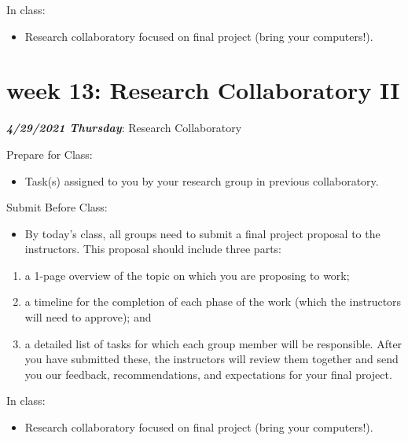\documentclass[
]{book}
\providecommand{\tightlist}{%
  \setlength{\itemsep}{0pt}\setlength{\parskip}{0pt}}
\begin{document}
In class:

\begin{itemize}
\tightlist
\item
  Research collaboratory focused on final project (bring your computers!).
\end{itemize}

\hypertarget{week-13-research-collaboratory-ii-1}{%
\chapter{week 13: Research Collaboratory II}\label{week-13-research-collaboratory-ii-1}}

\textbf{\emph{4/29/2021 Thursday}}: Research Collaboratory

Prepare for Class:

\begin{itemize}
\tightlist
\item
  Task(s) assigned to you by your research group in previous collaboratory.
\end{itemize}

Submit Before Class:

\begin{itemize}
\tightlist
\item
  By today's class, all groups need to submit a final project proposal to the instructors. This proposal should include three parts:
\end{itemize}

\begin{enumerate}
\def\labelenumi{(\arabic{enumi})}
\tightlist
\item
  a 1-page overview of the topic on which you are proposing to work;
\item
  a timeline for the completion of each phase of the work (which the instructors will need to approve); and
\item
  a detailed list of tasks for which each group member will be responsible. After you have submitted these, the instructors will review them together and send you our feedback, recommendations, and expectations for your final project.
\end{enumerate}

In class:

\begin{itemize}
\tightlist
\item
  Research collaboratory focused on final project (bring your computers!).
\end{itemize}
\end{document}
